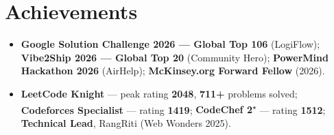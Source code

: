 \documentclass[a4paper,10pt]{article}
\newcommand{\sectionContentSpace}{\vspace{2mm}}
\begin{document}
\section{Achievements}
\sectionContentSpace
\begin{itemize}[leftmargin=3ex, rightmargin=2ex, noitemsep, topsep=4pt, parsep=0pt, partopsep=0pt, labelsep=1.2mm, itemsep=2pt]\small
  \item \textbf{Google Solution Challenge 2026 --- Global Top 106} (LogiFlow); \textbf{Vibe2Ship 2026 — Global Top 20} (Community Hero); \textbf{PowerMind Hackathon 2026} (AirHelp); \textbf{McKinsey.org Forward Fellow} (2026).
  \item \textbf{LeetCode Knight} --- peak rating \textbf{2048}, \textbf{711+} problems solved; \textbf{Codeforces Specialist} --- rating \textbf{1419}; \textbf{CodeChef 2\textsuperscript{$\star$}} --- rating \textbf{1512}; \textbf{Technical Lead}, RangRiti (Web Wonders 2025).
\end{itemize}
\end{document}
